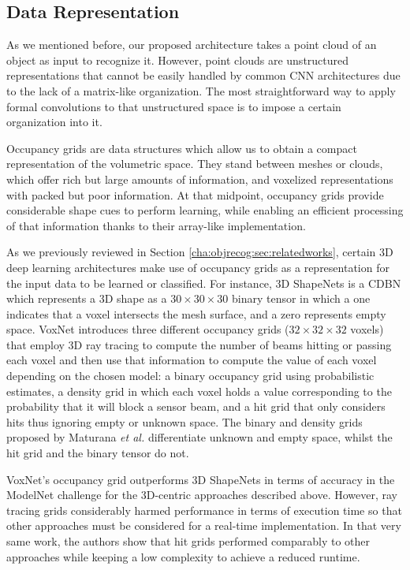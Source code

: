 \subsection{Data Representation}
\label{cha:objrecog:sec:pointnet:subsec:data}

As we mentioned before, our proposed architecture takes a point cloud of an object as input to recognize it. However, point clouds are unstructured representations that cannot be easily handled by common \ac{CNN} architectures due to the lack of a matrix-like organization. The most straightforward way to apply formal convolutions to that unstructured space is to impose a certain organization into it.

Occupancy grids are data structures which allow us to obtain a compact representation of the volumetric space. They stand between meshes or clouds, which offer rich but large amounts of information, and voxelized representations with packed but poor information. At that midpoint, occupancy grids provide considerable shape cues to perform learning, while enabling an efficient processing of that information thanks to their array-like implementation.


As we previously reviewed in Section \ref{cha:objrecog:sec:relatedworks}, certain 3D deep learning architectures make use of occupancy grids as a representation for the input data to be learned or classified. For instance, 3D ShapeNets \cite{Wu2015} is a \ac{CDBN} which represents a 3D shape as a $30 \times 30 \times 30$ binary tensor in which a one indicates that a voxel intersects the mesh surface, and a zero represents empty space. VoxNet \cite{Maturana2015} introduces three different occupancy grids ($32 \times 32 \times 32$ voxels) that employ 3D ray tracing to compute the number of beams hitting or passing each voxel and then use that information to compute the value of each voxel depending on the chosen model: a binary occupancy grid using probabilistic estimates, a density grid in which each voxel holds a value corresponding to the probability that it will block a sensor beam, and a hit grid that only considers hits thus ignoring empty or unknown space. The binary and density grids proposed by Maturana \emph{et al.} \cite{Maturana2015} differentiate unknown and empty space, whilst the hit grid and the binary tensor do not.

VoxNet’s occupancy grid outperforms 3D ShapeNets in terms of accuracy in the ModelNet challenge for the 3D-centric approaches described above. However, ray tracing grids considerably harmed performance in terms of execution time so that other approaches must be considered for a real-time implementation. In that very same work, the authors show that hit grids performed comparably to other approaches while keeping a low complexity to achieve a reduced runtime.

